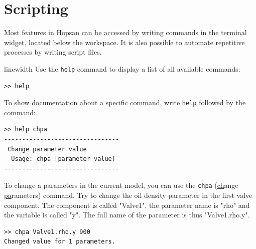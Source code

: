 \documentclass[a4paper,pdftex]{article}
\begin{document}
\newpage
\section{Scripting}
Most features in Hopsan can be accessed by writing commands in the terminal widget, located below the workspace. It is also possible to automate repetitive processes by writing script files. 

\begin{tutenumerate}
linewidth
Use the \texttt{help} command to display a list of all available commands:

\vspace{5pt}\hspace{10pt}
\begin{minipage}{0.5\linewidth}
\begin{verbatim}
>> help
\end{verbatim}
\end{minipage}
\vspace{5pt}

To show documentation about a specific command, write \texttt{help} followed by the command:

\vspace{5pt}\hspace{10pt}
\begin{minipage}{0.5\linewidth}
\begin{verbatim}
>> help chpa
--------------------------------
 Change parameter value
  Usage: chpa [parameter value]
--------------------------------
\end{verbatim}
\end{minipage}
\vspace{5pt}

To change a parameters in the current model, you can use the \texttt{chpa} (\underline{ch}ange \underline{pa}rameters) command. Try to change the oil density parameter in the first valve component. The component is called "Valve1", the parameter name is "rho" and the variable is called "y". The full name of the parameter is thus "Valve1.rho.y".

\vspace{5pt}\hspace{10pt}
\begin{minipage}{0.5\linewidth}
\begin{verbatim}
>> chpa Valve1.rho.y 900
Changed value for 1 parameters.
\end{verbatim}
\end{minipage}
\vspace{5pt}


\end{tutenumerate}
\end{document}
